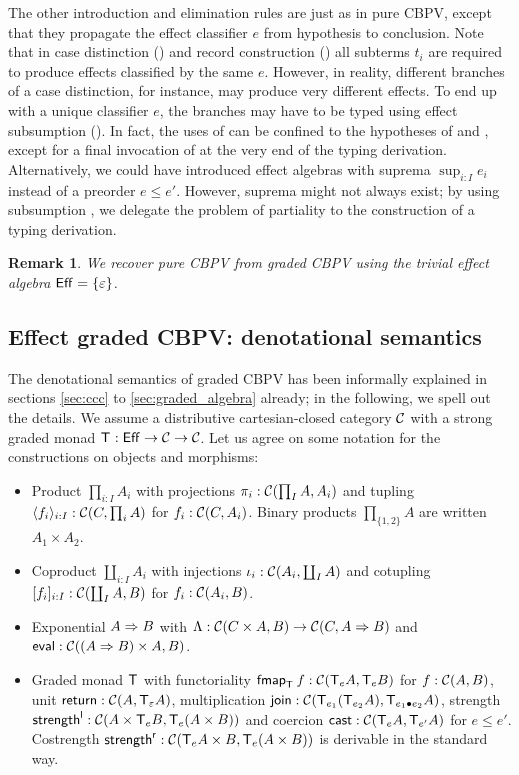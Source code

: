 \documentclass[acmsmall,review,anonymous]{acmart}\settopmatter{printfolios=true,printccs=false,printacmref=false}
\newtheorem{remark}{Remark}
\begin{document}
The other introduction and elimination rules are just as in pure
CBPV, except that they propagate the effect classifier $e$ from
hypothesis to conclusion.  Note that in case distinction (\relim\GS)
and record construction (\rintro\Pi) all subterms $t_i$ are required
to produce effects classified by the same $e$.  However, in reality,
different branches of a case distinction, for instance, may produce
very different effects.  To end up with a unique classifier $e$, the
branches may have to be typed using effect subsumption (\rsub).  In
fact, the uses of \rsub can be confined to the hypotheses of \relim\GS
and \rintro\Pi, except for a final invocation of \rsub at the very end
of the typing derivation.  Alternatively, we could have introduced
effect algebras with suprema $\sup_{i:I} e_i$ instead of a preorder $e
\leq e'$.  However, suprema might not always exist; by using
subsumption \rsub, we delegate the problem of partiality to the
construction of a typing derivation.

\begin{remark}\label{rem:cbpv}
  We recover pure CBPV from graded CBPV using the trivial effect
  algebra $\Eff = \{\Ge\}$.
\end{remark}

\subsection{Effect graded CBPV: denotational semantics}

The denotational semantics of graded CBPV has been informally explained in
sections \ref{sec:ccc} to \ref{sec:graded_algebra} already; in the following,
we spell out the details.  We assume a distributive cartesian-closed
category $\CC$ with a strong graded monad $\T : \Eff \to \CC \to \CC$.
Let us agree on some notation for the constructions on objects and
morphisms:
\begin{itemize}
\item Product $\prod_{i:I} A_i$ with projections $\pi_i : \CC(\prod_I
  A, A_i)$ and tupling $\langle f_i
  \rangle_{i:I} : \CC(C,\prod_i A)$ for $f_i : \CC(C,A_i)$.  Binary
  products $\prod_{\{1,2\}} A$ are written $A_1 \times A_2$.
\item Coproduct $\coprod_{i:I} A_i$ with injections $\iota_i :
  \CC(A_i,\coprod_I A)$ and cotupling $[f_i]_{i:I} : \CC(\coprod_I A,
  B)$ for $f_i : \CC(A_i,B)$.
\item Exponential $A \To B$ with $\Lambda : \CC(C \times A, B) \to
  \CC(C, A \To B)$ and $\teval : \CC((A \To B) \times A, B)$.
\item Graded monad $\T$ with functoriality $\fmap[\T] f :
  \CC(\T[e]A,\T[e]B)$ for $f : \CC(A,B)$,
  unit $\treturn : \CC(A,\T[\Ge]A)$,
  multiplication $\tjoin : \CC(\T[e_1](\T[e_2]A),\T[e_1 \bu e_2]A)$,
  strength $\strengthl : \CC(A \times \T[e]B, \T[e](A \times B))$ and
  coercion $\tcast : \CC(\T[e]A,\T[e']A)$ for $e \leq e'$.
  Costrength $\strengthr : \CC(\T[e]A \times B, \T[e](A \times B))$
  is derivable in the standard way.
\end{itemize}
\end{document}
